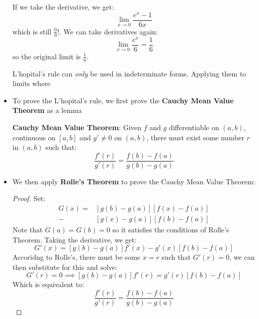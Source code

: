 \begin{itemize}
\begin{example}
        If we take the derivative, we get:
        \begin{equation}
            \lim_{x\to 0} \frac{e^x-1}{6x}
        \end{equation}
        which is still $\frac{0}{0}$!. We can take derivatives again:
        \begin{equation}
            \lim_{x\to 0} \frac{e^x}{6}=\frac{1}{6}
        \end{equation}
        so the original limit is $\frac{1}{6}$.
    \end{example}
    \begin{warning}
        L'hopital's rule can \textit{only} be used in indeterminate forms. Applying them to limits where 
    \end{warning}
    \item To prove the L'hopital's rule, we first prove the \textbf{Cauchy Mean Value Theorem} as a lemma
    \begin{theorem}
        \textbf{Cauchy Mean Value Theorem}: Given $f$ and $g$ differentiable on $(a,b)$, continuous on $[a,b]$ and $g'\neq 0$ on $(a,b)$, there must exist some number $r$ in $(a,b)$ such that:
        \begin{equation}
            \frac{f'(r)}{g'(r)} = \frac{f(b)-f(a)}{g(b)-g(a)}
        \end{equation}
    \end{theorem}
    \item We then apply \textbf{Rolle's Theorem} to prove the Cauchy Mean Value Theorem:
    \begin{proof}
        Set:
        \begin{align*}
            G(x) = &[g(b)-g(a)][f(x)-f(a)] \\ 
                -&[g(x)-g(a)][f(b)-f(a)]
        \end{align*}
        Note that $G(a)=G(b)=0$ so it satisfies the conditions of Rolle's Theorem. Taking the derivative, we get:
        \begin{equation}
            G'(x) = [g(b)-g(a)]f'(x)-g'(x)[f(b)-f(a)]
        \end{equation}
        Accoridng to Rolle's, there must be some $x=r$ such that $G'(r)=0$, we can then substitute for this and solve:
        \begin{equation}
            G'(r)=0 \implies [g(b)-g(a)]f'(r) = g'(r)[f(b)-f(a)]
        \end{equation}
        Which is equivalent to:
        \begin{equation}
            \frac{f'(r)}{g'(r)} = \frac{f(b)-f(a)}{g(b)-g(a)}

\end{equation}
\end{proof}
\end{itemize}
